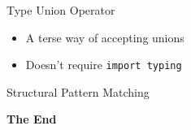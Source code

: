 \documentclass[aspectratio=169,xcolor=dvipsnames]{beamer}
\begin{document}
\begin{frame}{Type Union Operator}
    \begin{itemize}
      \item A terse way of accepting unions
      \item Doesn't require \texttt{import typing}
  \begin{example}
    
  \end{example}
  \end{itemize}
\end{frame}


\begin{frame}{Structural Pattern Matching}
  \begin{example}
  
  \end{example}
\end{frame}


\begin{frame}
    \Huge{\centerline{\textbf{The End}}}
\end{frame}

\end{document}
